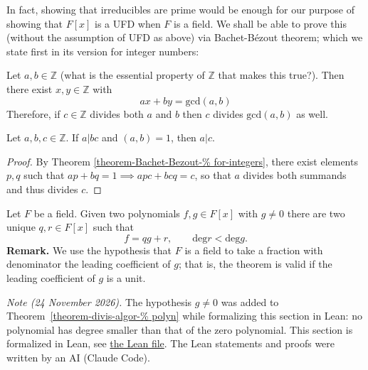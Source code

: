 In fact, showing that irreducibles are prime
would be enough for our purpose of
showing that $F[x]$ is a UFD when $F$ is a
field. We shall be able to prove this
(without the assumption of UFD as above) via
Bachet-Bézout theorem; which we
state first in its version for integer
numbers:

\begin{theorem}
\label{theorem-Bachet-Bezout-%
for-integers}
\begin{reference}
\cite[Theorem 1.7]{MMST}
\end{reference}
Let $a,b \in \mathbb{Z}$ (what is the
essential property of $\mathbb{Z}$ that
makes this true?). Then
there exist $x,y \in \mathbb{Z}$ with
 $$
ax+by=\text{gcd}(a,b)
$$
Therefore, if $c \in \mathbb{Z}$ divides both
$a$ and $b$ then $c$ divides
$\text{gcd}(a,b)$ as well.
\end{theorem}

\begin{lemma}
\label{lemma-relat-prime-%
divid-impli-divid}
Let $a,b,c \in \mathbb{Z}$. If $a|bc$ and
$(a,b)=1$, then $a|c$.
\end{lemma}

\begin{proof}
By Theorem
\ref{theorem-Bachet-Bezout-%
for-integers},
there exist elements $p,q$ such
that $ap+bq=1\implies apc+bcq=c$, so that $a$
divides both summands and thus
divides $c$.
\end{proof}

\begin{theorem}
\label{theorem-divis-algor-%
polyn}
\begin{reference}
\cite[Theorem 1.48]{MMST}
\end{reference}
Let $F$ be a field. Given two polynomials
$f,g \in F[x]$ with $g \neq 0$
there are two unique
$q,r \in F[x]$ such that
$$
f=qg+r,\qquad \text{deg}r<\text{deg}g.
$$
{\bf Remark.} We use the hypothesis that $F$
is a field to take a fraction with
denominator the leading coefficient of $g$;
that is, the theorem is valid if the
leading coefficient of $g$ is a unit.
\end{theorem}

\medskip\noindent
{\it Note (24 November 2026).}
The hypothesis $g \neq 0$ was added to
Theorem~\ref{theorem-divis-algor-%
polyn}
while formalizing this section in Lean:
no polynomial has degree smaller than
that of the zero polynomial.
This section is formalized in Lean, see
\href{https://github.com/danimalabares/%
heap-project/blob/main/lean/HeapProject/%
CommutativeAlgebra/UFD.lean}
{the Lean file}.
The Lean statements and proofs
were written by an AI (Claude Code).

